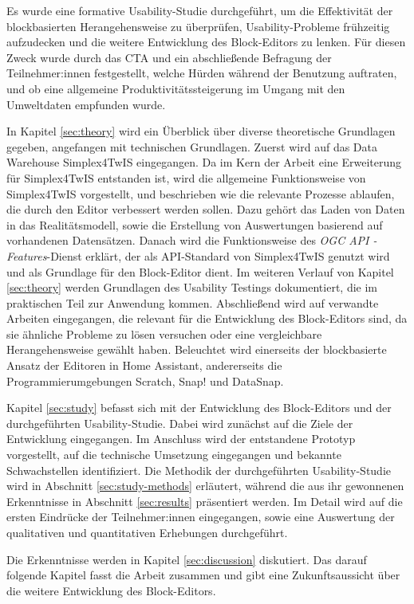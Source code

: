 Es wurde eine formative Usability-Studie durchgeführt, um die Effektivität der blockbasierten Herangehensweise zu überprüfen, Usability-Probleme frühzeitig aufzudecken und die weitere Entwicklung des Block-Editors zu lenken. Für diesen Zweck wurde durch das \acf{CTA} und ein abschließende Befragung der Teilnehmer:innen festgestellt, welche Hürden während der Benutzung auftraten, und ob eine allgemeine Produktivitätssteigerung im Umgang mit den Umweltdaten empfunden wurde.

\pskip
In Kapitel \ref{sec:theory} wird ein Überblick über diverse theoretische Grundlagen gegeben, angefangen mit technischen Grundlagen. Zuerst wird auf das Data Warehouse Simplex4TwIS eingegangen. Da im Kern der Arbeit eine Erweiterung für Simplex4TwIS entstanden ist, wird die allgemeine Funktionsweise von Simplex4TwIS vorgestellt, und beschrieben wie die relevante Prozesse ablaufen, die durch den Editor verbessert werden sollen. Dazu gehört das Laden von Daten in das Realitätsmodell, sowie die Erstellung von Auswertungen basierend auf vorhandenen Datensätzen. Danach wird die Funktionsweise des \textit{\acs{OGC} \acs{API} - Features}-Dienst erklärt, der als \acs{API}-Standard von Simplex4TwIS genutzt wird und als Grundlage für den Block-Editor dient. Im weiteren Verlauf von Kapitel \ref{sec:theory} werden Grundlagen des Usability Testings dokumentiert, die im praktischen Teil zur Anwendung kommen. Abschließend wird auf verwandte Arbeiten eingegangen, die relevant für die Entwicklung des Block-Editors sind, da sie ähnliche Probleme zu lösen versuchen oder eine vergleichbare Herangehensweise gewählt haben. Beleuchtet wird einerseits der blockbasierte Ansatz der Editoren in Home Assistant, andererseits die Programmierumgebungen Scratch, Snap! und DataSnap.

Kapitel \ref{sec:study} befasst sich mit der Entwicklung des Block-Editors und der durchgeführten Usability-Studie. Dabei wird zunächst auf die Ziele der Entwicklung eingegangen. Im Anschluss wird der entstandene Prototyp vorgestellt, auf die technische Umsetzung eingegangen und bekannte Schwachstellen identifiziert. Die Methodik der durchgeführten Usability-Studie wird in Abschnitt \ref{sec:study-methods} erläutert, während die aus ihr gewonnenen Erkenntnisse in Abschnitt \ref{sec:results} präsentiert werden. Im Detail wird auf die ersten Eindrücke der Teilnehmer:innen eingegangen, sowie eine Auswertung der qualitativen und quantitativen Erhebungen durchgeführt.

Die Erkenntnisse werden in Kapitel \ref{sec:discussion} diskutiert. Das darauf folgende Kapitel fasst die Arbeit zusammen und gibt eine Zukunftsaussicht über die weitere Entwicklung des Block-Editors.
